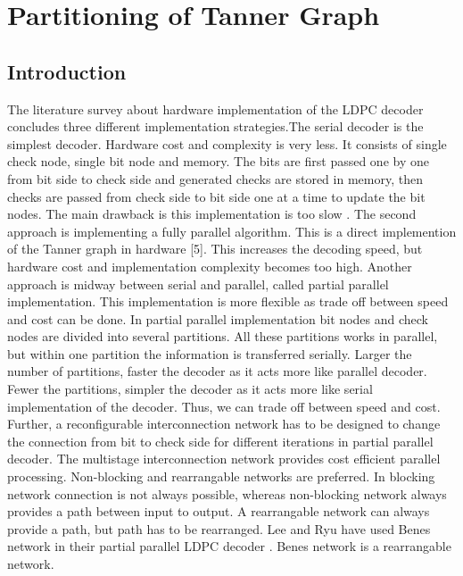 
\chapter{Partitioning of Tanner Graph} 

\label{Chapter6} 


\section{Introduction}
The literature survey about hardware implementation of the LDPC decoder concludes three different implementation strategies.The serial decoder is the simplest decoder. Hardware cost and complexity is very less. It consists of single check node, single bit node and memory. The bits are first passed one by one from bit side to check side and generated checks are stored in memory, then checks are passed from check side to bit side one at a time to update the bit nodes. The main drawback is this implementation is too slow \cite{4}. The second approach is implementing a fully parallel algorithm. This is a direct implemention of the Tanner graph in hardware [5]. This increases the decoding speed, but hardware cost and implementation complexity becomes too high. Another approach is midway between serial and parallel, called partial parallel implementation. This implementation is more flexible as trade off between speed and cost can be done. In partial parallel implementation bit nodes and check nodes are divided into several partitions. All these partitions works in parallel, but within one partition the information is transferred serially. Larger the number of partitions, faster the decoder as it acts more like parallel decoder. Fewer the partitions, simpler the decoder as it acts more like serial implementation of the decoder. Thus, we can trade off between speed and cost. Further, a reconfigurable interconnection network has to be designed to change the connection from bit to check side for different iterations in partial parallel decoder. The multistage interconnection network provides cost efficient parallel processing. Non-blocking and rearrangable networks are preferred. In blocking network connection is not always possible, whereas non-blocking network always provides a path between input to output. A rearrangable network can always provide a path, but path has to be rearranged. Lee and Ryu have used Benes network in their partial parallel LDPC decoder \cite{5}. Benes network is a rearrangable network.

